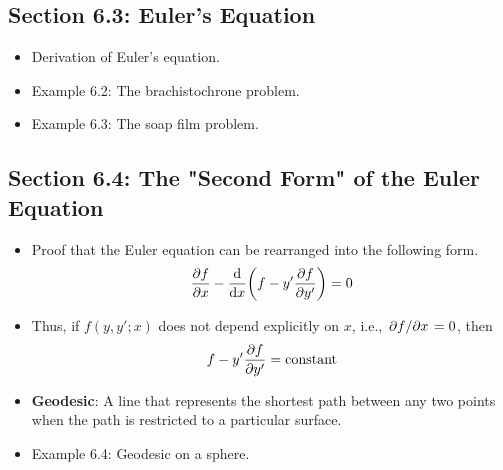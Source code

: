 \documentclass[../notes.tex]{subfiles}
\begin{document}
\subsection*{Section 6.3: Euler's Equation}
\begin{itemize}
    \item Derivation of Euler's equation.
    \item Example 6.2: The brachistochrone problem.
    \item Example 6.3: The soap film problem.
\end{itemize}


\subsection*{Section 6.4: The "Second Form" of the Euler Equation}
\begin{itemize}
    \item Proof that the Euler equation can be rearranged into the following form.
    \begin{equation*}
        \pdv{f}{x}-\dv{x}(f-y'\pdv{f}{y'}) = 0
    \end{equation*}
    \item Thus, if $f(y,y';x)$ does not depend explicitly on $x$, i.e., $\pdv*{f}{x}=0$, then
    \begin{equation*}
        f-y'\pdv{f}{y'} = \text{constant}
    \end{equation*}
    \item \textbf{Geodesic}: A line that represents the shortest path between any two points when the path is restricted to a particular surface.
    \item Example 6.4: Geodesic on a sphere.
\end{itemize}
\end{document}
